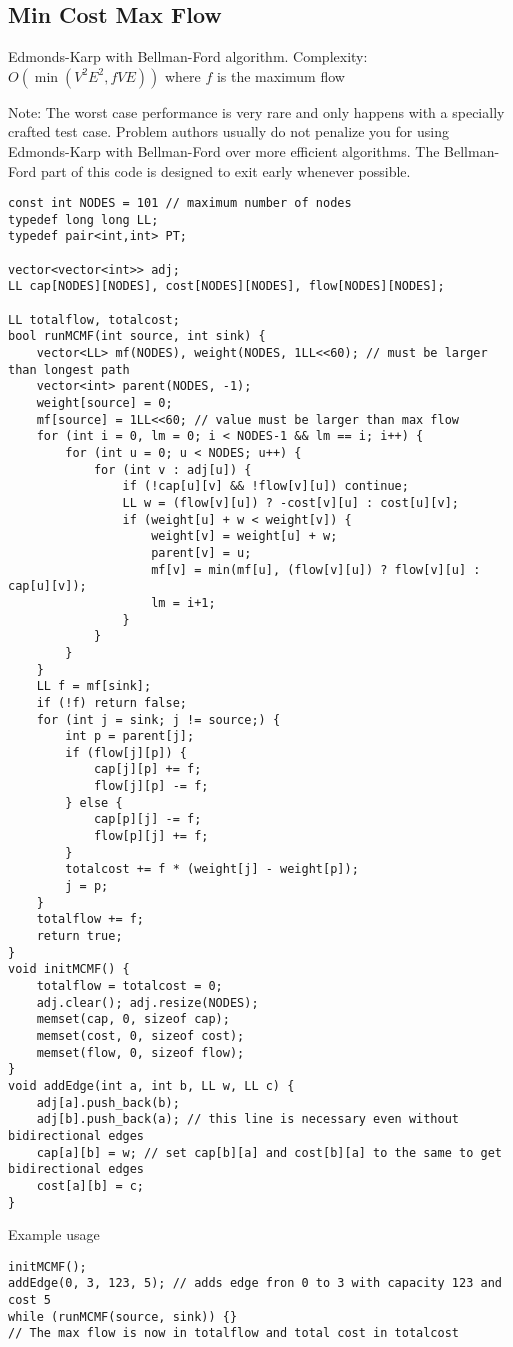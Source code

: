 \documentclass[letterpaper]{article}
\begin{document}
\clearpage

\subsection{Min Cost Max Flow}

Edmonds-Karp with Bellman-Ford algorithm. Complexity: $O\left(\min\left(V^2E^2, fVE\right)\right)$ where $f$ is the maximum flow

Note: The worst case performance is very rare and only happens with a specially crafted test case. Problem authors usually do not penalize you for using Edmonds-Karp with Bellman-Ford over more efficient algorithms. The Bellman-Ford part of this code is designed to exit early whenever possible.

\begin{lstlisting}
const int NODES = 101 // maximum number of nodes
typedef long long LL;
typedef pair<int,int> PT;

vector<vector<int>> adj;
LL cap[NODES][NODES], cost[NODES][NODES], flow[NODES][NODES];

LL totalflow, totalcost;
bool runMCMF(int source, int sink) {
	vector<LL> mf(NODES), weight(NODES, 1LL<<60); // must be larger than longest path
	vector<int> parent(NODES, -1);
	weight[source] = 0;
	mf[source] = 1LL<<60; // value must be larger than max flow
	for (int i = 0, lm = 0; i < NODES-1 && lm == i; i++) {
		for (int u = 0; u < NODES; u++) {
			for (int v : adj[u]) {
				if (!cap[u][v] && !flow[v][u]) continue;
				LL w = (flow[v][u]) ? -cost[v][u] : cost[u][v];
				if (weight[u] + w < weight[v]) {
					weight[v] = weight[u] + w;
					parent[v] = u;
					mf[v] = min(mf[u], (flow[v][u]) ? flow[v][u] : cap[u][v]);
					lm = i+1;
				}
			}
		}
	}
	LL f = mf[sink];
	if (!f) return false;
	for (int j = sink; j != source;) {
		int p = parent[j];
		if (flow[j][p]) {
			cap[j][p] += f;
			flow[j][p] -= f;
		} else {
			cap[p][j] -= f;
			flow[p][j] += f;
		}
		totalcost += f * (weight[j] - weight[p]);
		j = p;
	}
	totalflow += f;
	return true;
}
void initMCMF() {
	totalflow = totalcost = 0;
	adj.clear(); adj.resize(NODES);
	memset(cap, 0, sizeof cap);
	memset(cost, 0, sizeof cost);
	memset(flow, 0, sizeof flow);
}
void addEdge(int a, int b, LL w, LL c) {
	adj[a].push_back(b);
	adj[b].push_back(a); // this line is necessary even without bidirectional edges
	cap[a][b] = w; // set cap[b][a] and cost[b][a] to the same to get bidirectional edges
	cost[a][b] = c;
}
\end{lstlisting}
Example usage
\begin{lstlisting}
initMCMF();
addEdge(0, 3, 123, 5); // adds edge fron 0 to 3 with capacity 123 and cost 5
while (runMCMF(source, sink)) {}
// The max flow is now in totalflow and total cost in totalcost
\end{lstlisting}
\end{document}
